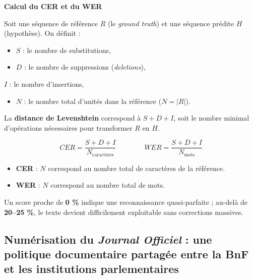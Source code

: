 \begin{encadre}
\textbf{Calcul du CER et du WER}

Soit une séquence de référence $R$ (le \emph{ground truth}) et une séquence prédite $H$ (hypothèse).
On définit :

\begin{itemize}
\item $S$ : le nombre de substitutions,

\item $D$ : le nombre de suppressions (\emph{deletions}),
\end{itemize}
$I$ : le nombre d’insertions,
\begin{itemize}
\item $N$ : le nombre total d’unités dans la référence ($N = |R|$).

\end{itemize}
La \textbf{distance de Levenshtein} correspond à $S + D + I$, soit le nombre minimal d’opérations nécessaires pour transformer $R$ en $H$.

$$
CER = \frac{S + D + I}{N_\text{caractères}}
\qquad\qquad
WER = \frac{S + D + I}{N_\text{mots}}
$$

\begin{itemize}
\item \textbf{CER} : $N$ correspond au nombre total de caractères de la référence.

\item \textbf{WER} : $N$ correspond au nombre total de mots.
\end{itemize}
Un score proche de \textbf{0 \%} indique une reconnaissance quasi-parfaite ; au-delà de \textbf{20–25 \%}, le texte devient difficilement exploitable sans corrections massives.

\end{encadre}
\subsection{Numérisation du \emph{Journal Officiel} : une politique documentaire partagée entre la BnF et les institutions parlementaires}

